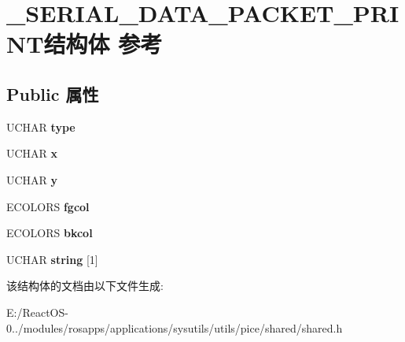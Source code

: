 \hypertarget{struct___s_e_r_i_a_l___d_a_t_a___p_a_c_k_e_t___p_r_i_n_t}{}\section{\+\_\+\+S\+E\+R\+I\+A\+L\+\_\+\+D\+A\+T\+A\+\_\+\+P\+A\+C\+K\+E\+T\+\_\+\+P\+R\+I\+N\+T结构体 参考}
\label{struct___s_e_r_i_a_l___d_a_t_a___p_a_c_k_e_t___p_r_i_n_t}
\subsection*{Public 属性}
\begin{DoxyCompactItemize}
\item 
\mbox{\label{struct___s_e_r_i_a_l___d_a_t_a___p_a_c_k_e_t___p_r_i_n_t_a879e33acc0ae454993843a1b8877380a}} 
U\+C\+H\+AR {\bfseries type}
\item 
\mbox{\label{struct___s_e_r_i_a_l___d_a_t_a___p_a_c_k_e_t___p_r_i_n_t_a657fc7e97d6cb8bbb64d14f4ba982953}} 
U\+C\+H\+AR {\bfseries x}
\item 
\mbox{\label{struct___s_e_r_i_a_l___d_a_t_a___p_a_c_k_e_t___p_r_i_n_t_a361f2bc8fab2338a03a2f13ae520e282}} 
U\+C\+H\+AR {\bfseries y}
\item 
\mbox{\label{struct___s_e_r_i_a_l___d_a_t_a___p_a_c_k_e_t___p_r_i_n_t_ab1f0659929964e10315933677b0c825d}} 
E\+C\+O\+L\+O\+RS {\bfseries fgcol}
\item 
\mbox{\label{struct___s_e_r_i_a_l___d_a_t_a___p_a_c_k_e_t___p_r_i_n_t_adfc8bbae002d4309134fc2c76609d9b1}} 
E\+C\+O\+L\+O\+RS {\bfseries bkcol}
\item 
\mbox{\label{struct___s_e_r_i_a_l___d_a_t_a___p_a_c_k_e_t___p_r_i_n_t_aad745a8b4aa3dd31c90ef5b9507c05dd}} 
U\+C\+H\+AR {\bfseries string} \mbox{[}1\mbox{]}
\end{DoxyCompactItemize}


该结构体的文档由以下文件生成\+:\begin{DoxyCompactItemize}
\item 
E\+:/\+React\+O\+S-\/0../modules/rosapps/applications/sysutils/utils/pice/shared/shared.\+h\end{DoxyCompactItemize}
